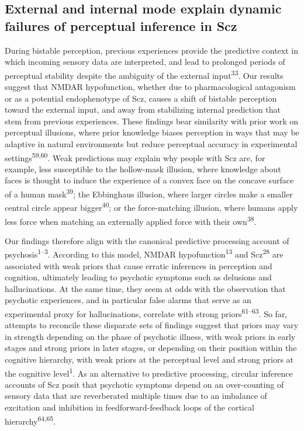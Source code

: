 \documentclass[
]{article}
\begin{document}
\subsection{External and internal mode explain dynamic failures of
perceptual inference in
Scz}\label{external-and-internal-mode-explain-dynamic-failures-of-perceptual-inference-in-scz}

During bistable perception, previous experiences provide the predictive
context in which incoming sensory data are interpreted, and lead to
prolonged periods of perceptual stability despite the ambiguity of the
external input\textsuperscript{33}. Our results suggest that NMDAR
hypofunction, whether due to pharmacological antagonism or as a
potential endophenotype of Scz, causes a shift of bistable perception
toward the external input, and away from stabilizing internal prediction
that stem from previous experiences. These findings bear similarity with
prior work on perceptual illusions, where prior knowledge biases
perception in ways that may be adaptive in natural environments but
reduce perceptual accuracy in experimental
settings\textsuperscript{59,60}. Weak predictions may explain why people
with Scz are, for example, less susceptible to the hollow-mask illusion,
where knowledge about faces is thought to induce the experience of a
convex face on the concave surface of a human mask\textsuperscript{39};
the Ebbinghaus illusion, where larger circles make a smaller central
circle appear bigger\textsuperscript{40}; or the force-matching
illusion, where humans apply less force when matching an externally
applied force with their own\textsuperscript{38}.

Our findings therefore align with the canonical predictive processing
account of psychosis\textsuperscript{1--3}. According to this model,
NMDAR hypofunction\textsuperscript{13} and Scz\textsuperscript{28} are
associated with weak priors that cause erratic inferences in perception
and cognition, ultimately leading to psychotic symptoms such as
delusions and hallucinations. At the same time, they seem at odds with
the observation that psychotic experiences, and in particular false
alarms that serve as an experimental proxy for hallucinations, correlate
with strong priors\textsuperscript{61--63}. So far, attempts to
reconcile these disparate sets of findings suggest that priors may vary
in strength depending on the phase of psychotic illness, with weak
priors in early stages and strong priors in later stages, or depending
on their position within the cognitive hierarchy, with weak priors at
the perceptual level and strong priors at the cognitive
level\textsuperscript{1}. As an alternative to predictive processing,
circular inference accounts of Scz posit that psychotic symptoms depend
on an over-counting of sensory data that are reverberated multiple times
due to an imbalance of excitation and inhibition in feedforward-feedback
loops of the cortical hierarchy\textsuperscript{64,65}.
\end{document}
